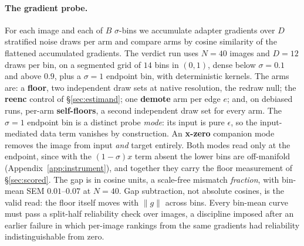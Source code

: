 \paragraph{The gradient probe.}
For each image and each of $B$ $\sigma$-bins we accumulate
adapter gradients over $D$ stratified noise draws per
arm and compare arms by cosine
similarity of the flattened accumulated gradients. The verdict run
uses $N = 40$ images and $D = 12$ draws per bin, on a segmented grid
of $14$ bins in $(0, 1)$, dense below $\sigma = 0.1$ and above $0.9$,
plus a $\sigma{=}1$ endpoint bin, with deterministic kernels. The
arms are: a
\textbf{floor}, two independent draw sets at native resolution, the
redraw null; the \textbf{reenc} control of \S\ref{sec:estimand}; one
\textbf{demote} arm per edge $e$; and, on debiased runs, per-arm
\textbf{self-floors}, a second independent draw set for every arm.
The $\sigma{=}1$ endpoint bin is a distinct probe \emph{mode}: its
input is pure $\epsilon$, so the input-mediated data term vanishes by
construction. An \textbf{x-zero} companion mode removes the image
from input \emph{and} target entirely. Both modes read only at the
endpoint, since with the $(1{-}\sigma)x$ term absent the lower bins
are off-manifold (Appendix~\ref{app:instrument}), and together they
carry the floor measurement of \S\ref{sec:scored}. The gap is in
cosine units, a scale-free mismatch \emph{fraction}, with bin-mean
SEM $0.01$--$0.07$ at $N{=}40$. Gap subtraction, not absolute
cosines, is the valid read: the floor itself moves with $\|g\|$
across bins. Every bin-mean curve must pass a split-half reliability
check over images, a discipline imposed after an earlier failure in
which per-image rankings from the same gradients had reliability
indistinguishable from zero.

